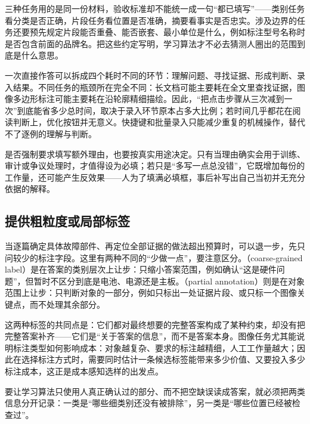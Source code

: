 三种任务用的是同一份材料，验收标准却不能统一成一句“都已填写”——类别任务看分类是否正确，片段任务看位置是否准确，摘要看事实是否忠实。涉及边界的任务还要预先规定片段能否重叠、能否嵌套、最小单位是什么，例如标注型号名称时是否包含前面的品牌名。把这些约定写明，学习算法才不必去猜测人圈出的范围到底是什么意思。

一次直接作答可以拆成四个耗时不同的环节：理解问题、寻找证据、形成判断、录入结果。不同任务的瓶颈所在完全不同：长文档可能主要耗在全文里查找证据，图像多边形标注可能主要耗在沿轮廓精细描绘。因此，“把点击步骤从三次减到一次”到底能省多少总时间，取决于录入环节原本占多大比例；若时间几乎都花在阅读判断上，优化按钮并无意义。快捷键和批量录入只能减少重复的机械操作，替代不了逐例的理解与判断。

是否强制要求填写额外理由，也要按真实用途决定。只有当理由确实会用于训练、审计或争议处理时，才值得设为必填；若只是“多写一点总没错”，它既增加每份的工作量，还可能产生反效果——人为了填满必填框，事后补写出自己当初并无充分依据的解释。

\subsection{提供粗粒度或局部标签}
\label{sec:knowledge-acquisition-human-partial-label}

当逐篇确定具体故障部件、再定位全部证据的做法超出预算时，可以退一步，先只问较少的标注字段。这里有两种不同的“少做一点”，要注意区分。（coarse-grained label）是在答案的类别层次上让步：只缩小答案范围，例如确认“这是硬件问题”，但暂时不区分到底是电池、电源还是主板。（partial annotation）则是在对象范围上让步：只判断对象的一部分，例如只标出一处证据片段、或只标一个图像关键点，而不处理其余部分。

这两种标签的共同点是：它们都对最终想要的完整答案构成了某种约束，却没有把完整答案补齐——它们是“关于答案的信息”，而不是答案本身。图像任务尤其能说明标注类型如何影响成本：对象越复杂、要求的标注越精细，人工工作量越大；因此在选择标注方式时，需要同时估计一条候选标签能带来多少价值、又要投入多少标注成本，这正是成本感知选样的出发点。

要让学习算法只使用人真正确认过的部分、而不把空缺误读成答案，就必须把两类信息分开记录：一类是“哪些细类别还没有被排除”，另一类是“哪些位置已经被检查过”。

